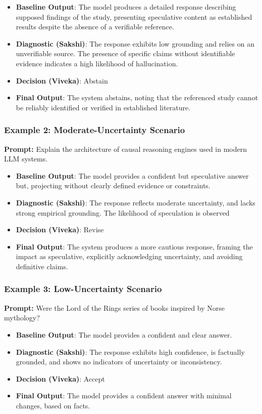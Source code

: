 \documentclass[12pt,a4paper]{article}
\begin{document}
\begin{itemize}
    \item \textbf{Baseline Output}: The model produces a detailed response describing supposed findings of the study, presenting speculative content as established results despite the absence of a verifiable reference.
    \item \textbf{Diagnostic (Sakshi)}: The response exhibits low grounding and relies on an unverifiable source. The presence of specific claims without identifiable evidence indicates a high likelihood of hallucination.
    \item \textbf{Decision (Viveka)}: Abstain
    \item \textbf{Final Output}: The system abstains, noting that the referenced study cannot be reliably identified or verified in established literature.
\end{itemize}

\subsubsection*{Example 2: Moderate-Uncertainty Scenario}
\textbf{Prompt:} Explain the architecture of causal reasoning engines used in modern LLM systems.

\begin{itemize}
    \item \textbf{Baseline Output}: The model provides a confident but speculative answer but, projecting without clearly defined evidence or constraints.
    \item \textbf{Diagnostic (Sakshi)}: The response reflects moderate uncertainty, and lacks strong empirical grounding. The likelihood of speculation is observed
    \item \textbf{Decision (Viveka)}: Revise
    \item \textbf{Final Output}: The system produces a more cautious response, framing the impact as speculative, explicitly acknowledging uncertainty, and avoiding definitive claims.
\end{itemize}

\subsubsection*{Example 3: Low-Uncertainty Scenario}
\textbf{Prompt:} Were the Lord of the Rings series of books inspired by Norse mythology?

\begin{itemize}
    \item \textbf{Baseline Output}: The model provides a confident and clear answer.
    \item \textbf{Diagnostic (Sakshi)}: The response exhibits high confidence, is factually grounded, and shows no indicators of uncertainty or inconsistency.
    \item \textbf{Decision (Viveka)}: Accept
    \item \textbf{Final Output}: The model provides a confident answer with minimal changes, based on facts.
\end{itemize}
\end{document}
